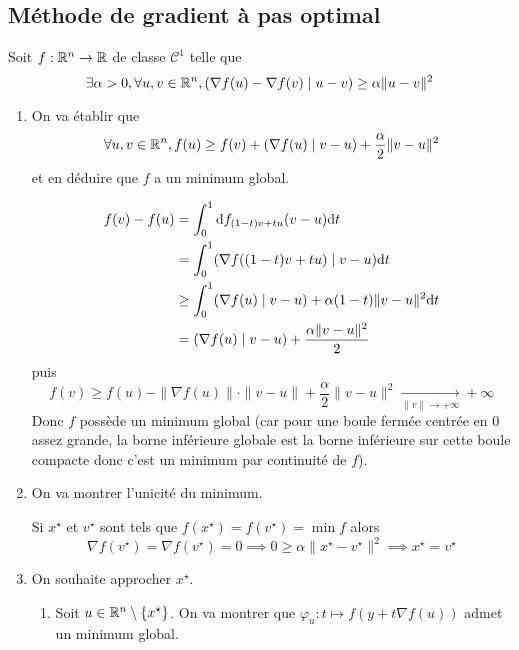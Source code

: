 \subsection{Méthode de gradient à pas optimal}

Soit $f:\mathbb R^n\to \mathbb R$ de classe $\mathcal C^1$ telle que \[
    \exists \alpha > 0, \forall u, v\in\mathbb R^n, (\nabla f(u)-\nabla f(v)\;|\; u-v)\geq \alpha\|u-v\|^2
\]

\begin{enumerate}
    \item On va établir que \[
            \forall u, v\in\mathbb R^n, f(u)\geq f(v)+(\nabla f(u)\;|\;v-u)+\frac\alpha2\|v-u\|^2
        \]
        et en déduire que $f$ a un minimum global.

        \begin{align*}
            f(v)-f(u) &= \int_0^1\mathrm{d} f_{(1-t)v+tu}(v-u)\mathrm{d} t \\
                      &= \int_0^1(\nabla f((1-t)v+tu)\;|\; v-u) \mathrm{d} t \\ 
                      &\geq \int_0^1(\nabla f(u)\;|\;v-u)+\alpha(1-t)\|v-u\|^2\mathrm{d} t \\
                      &=(\nabla f(u)\;|\;v-u)+\frac{\alpha\|v-u\|^2}2
        \end{align*}
        puis \[
            f(v)\geq f(u)-\|\nabla f(u)\|\cdot\|v-u\|+\frac\alpha2\|v-u\|^2\xrightarrow[\|v\|\to+\infty]{}+\infty
        \]
        Donc $f$ possède un minimum global (car pour une boule fermée centrée en $0$ assez grande, la borne inférieure globale est la borne inférieure sur cette boule compacte donc c'est un minimum par continuité de $f$).
    \item On va montrer l'unicité du minimum.

        Si $x^\star$ et $v^\star$ sont tels que $f(x^\star)=f(v^\star)=\min f$ alors \[
            \nabla f(v^\star)=\nabla f(v^\star)=0\implies 0\geq \alpha\|x^\star-v^\star\|^2\implies x^\star=v^\star
        \]
    \item On souhaite approcher $x^\star$.
        \begin{enumerate}
            \item Soit $u\in\mathbb R^n\setminus\{x^\star\}$. On va montrer que $\varphi_u:t\longmapsto f(y+t\nabla f(u))$ admet un minimum global.


\end{enumerate}
\end{enumerate}
